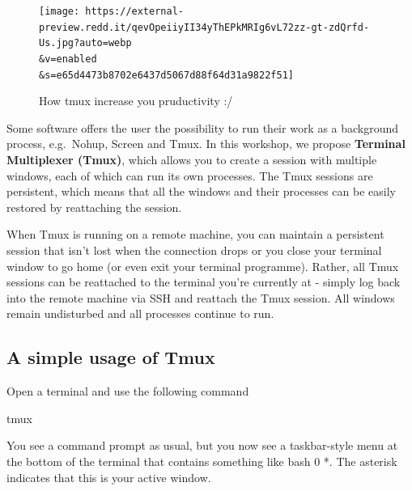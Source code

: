 \documentclass[
  letterpaper,
  DIV=11,
  numbers=noendperiod]{scrreprt}
\newenvironment{Shaded}{\begin{snugshade}}{\end{snugshade}}
\newcommand{\ExtensionTok}[1]{\textcolor[rgb]{0.00,0.23,0.31}{#1}}
\begin{document}
\begin{figure}

{\centering \texttt{[image: https://external-preview.redd.it/qevOpeiiyII34yThEPkMRIg6vL72zz-gt-zdQrfd-Us.jpg?auto=webp\\\&v=enabled\\\&s=e65d4473b8702e6437d5067d88f64d31a9822f51]}

}

\caption{How tmux increase you pruductivity :/}

\end{figure}

Some software offers the user the possibility to run their work as a
background process, e.g.~Nohup, Screen and Tmux. In this workshop, we
propose \textbf{Terminal Multiplexer (Tmux)}, which allows you to create
a session with multiple windows, each of which can run its own
processes. The Tmux sessions are persistent, which means that all the
windows and their processes can be easily restored by reattaching the
session.

When Tmux is running on a remote machine, you can maintain a persistent
session that isn't lost when the connection drops or you close your
terminal window to go home (or even exit your terminal programme).
Rather, all Tmux sessions can be reattached to the terminal you're
currently at - simply log back into the remote machine via SSH and
reattach the Tmux session. All windows remain undisturbed and all
processes continue to run.

\hypertarget{a-simple-usage-of-tmux}{%
\subsection*{A simple usage of Tmux}\label{a-simple-usage-of-tmux}}

Open a terminal and use the following command

\begin{Shaded}
\begin{Highlighting}[]
\ExtensionTok{tmux}
\end{Highlighting}
\end{Shaded}

You see a command prompt as usual, but you now see a taskbar-style menu
at the bottom of the terminal that contains something like bash 0 *. The
asterisk indicates that this is your active window.
\end{document}
